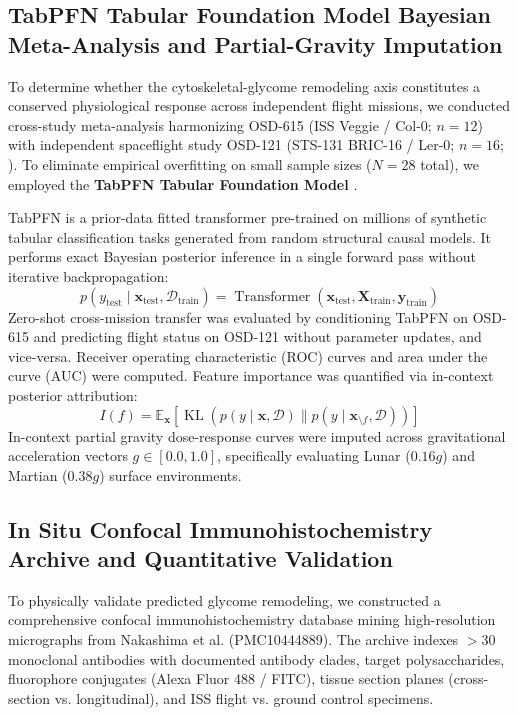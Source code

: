 \subsection{TabPFN Tabular Foundation Model Bayesian Meta-Analysis and Partial-Gravity Imputation}

To determine whether the cytoskeletal-glycome remodeling axis constitutes a conserved physiological response across independent flight missions, we conducted cross-study meta-analysis harmonizing OSD-615 (ISS Veggie / Col-0; $n = 12$) with independent spaceflight study OSD-121 (STS-131 BRIC-16 / Ler-0; $n = 16$; \cite{Paul2012_BRIC16}). To eliminate empirical overfitting on small sample sizes ($N = 28$ total), we employed the \textbf{TabPFN Tabular Foundation Model} \cite{Hollmann2025}.

TabPFN is a prior-data fitted transformer pre-trained on millions of synthetic tabular classification tasks generated from random structural causal models. It performs exact Bayesian posterior inference in a single forward pass without iterative backpropagation:
\begin{equation}
    p(y_{\text{test}} \mid \mathbf{x}_{\text{test}}, \mathcal{D}_{\text{train}}) = \operatorname{Transformer}(\mathbf{x}_{\text{test}}, \mathbf{X}_{\text{train}}, \mathbf{y}_{\text{train}})
\end{equation}
Zero-shot cross-mission transfer was evaluated by conditioning TabPFN on OSD-615 and predicting flight status on OSD-121 without parameter updates, and vice-versa. Receiver operating characteristic (ROC) curves and area under the curve (AUC) were computed. Feature importance was quantified via in-context posterior attribution:
\begin{equation}
    I(f) = \mathbb{E}_{\mathbf{x}}\left[ \operatorname{KL}\left( p(y \mid \mathbf{x}, \mathcal{D}) \parallel p(y \mid \mathbf{x}_{\setminus f}, \mathcal{D}) \right) \right]
\end{equation}
In-context partial gravity dose-response curves were imputed across gravitational acceleration vectors $g \in [0.0, 1.0]$, specifically evaluating Lunar ($0.16g$) and Martian ($0.38g$) surface environments.

\subsection{In Situ Confocal Immunohistochemistry Archive and Quantitative Validation}

To physically validate predicted glycome remodeling, we constructed a comprehensive confocal immunohistochemistry database mining high-resolution micrographs from Nakashima et al. \cite{Nakashima2023} (PMC10444889). The archive indexes $>30$ monoclonal antibodies with documented antibody clades, target polysaccharides, fluorophore conjugates (Alexa Fluor 488 / FITC), tissue section planes (cross-section vs. longitudinal), and ISS flight vs. ground control specimens.

